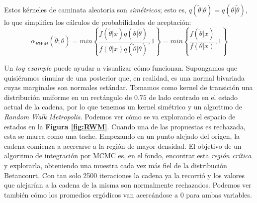 Estos kérneles de caminata aleatoria son \textit{simétricos}; esto es,  $q(\tilde{\theta}|\theta) = q(\theta |\tilde{\theta})$, lo que simplifica los cálculos de probabilidades de aceptación:
\begin{equation*}
\alpha_{RWM}(\tilde{\theta};\theta)=min\left\lbrace\dfrac{f(\tilde{\theta}|x)q(\theta|\tilde{\theta})}{f(\theta|x)q(\tilde{\theta}|\theta)},1\right\rbrace = min\left\lbrace\dfrac{f(\tilde{\theta}|x)}{f(\theta|x)},1\right\rbrace
\end{equation*}

Un \textit{toy example} puede ayudar a visualizar cómo funcionan. Supongamos que quisiéramos simular de una posterior que, en realidad, es una normal bivariada cuyas marginales son normales estándar. Tomamos como kernel de transición una distribución uniforme en un rectángulo de $0.75$ de lado centrado en el estado actual de la cadena, por lo que tenemos un kernel simétrico y un algoritmo de \textit{Random Walk Metropolis}. Podemos ver cómo se va explorando el espacio de estados en la \textbf{Figura \ref{fig:RWM}}. Cuando una de las propuestas es rechazada, esta se marca como una tache. Empezando en un punto alejado del origen, la cadena comienza a acercarse a la región de mayor densidad. El objetivo de un algoritmo de integración por MCMC es, en el fondo, encontrar esta \textit{región crítica} y explorarla, obteniendo una muestra cada vez más fiel de la distribución {\color{Red} Betancourt}. Con tan solo 2500 iteraciones la cadena ya la recorrió y los valores que alejarían a la cadena de la misma son normalmente rechazados. Podemos ver también cómo los promedios ergódicos van acercándose a $0$ para ambas variables.\\

